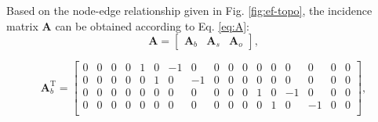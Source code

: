 \documentclass{article}
\def\T{\mathrm{T}}
\begin{document}
Based on the node-edge relationship given in Fig. \ref{fig:ef-topo}, the incidence matrix $\bm{A}$ can be obtained according to Eq. \ref{eq:A}:
\begin{equation}
    \bm{A} = 
    \begin{bmatrix}
        \bm{A}_b & \bm{A}_s & \bm{A}_o
    \end{bmatrix},
\end{equation}

\begin{equation}
    \bm{A}_b^\T = 
    \begin{bmatrix}
        0 & 0 & 0 & 0 & 1 & 0 &-1 & 0 & 0 & 0 & 0 & 0 & 0 & 0 & 0 & 0 & 0 \\
        0 & 0 & 0 & 0 & 0 & 1 & 0 &-1 & 0 & 0 & 0 & 0 & 0 & 0 & 0 & 0 & 0 \\
        0 & 0 & 0 & 0 & 0 & 0 & 0 & 0 & 0 & 0 & 0 & 1 & 0 &-1 & 0 & 0 & 0 \\
        0 & 0 & 0 & 0 & 0 & 0 & 0 & 0 & 0 & 0 & 0 & 0 & 1 & 0 &-1 & 0 & 0 \\
    \end{bmatrix},
\end{equation}
\end{document}
